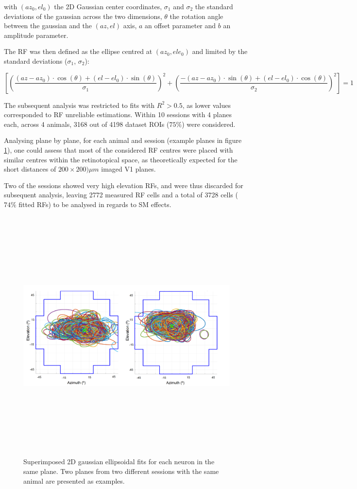 with $(az_0, el_0)$ the 2D Gaussian center coordinates, $\sigma_1$ and $\sigma_2$ the standard deviations of the gaussian across the two dimensions, $\theta$ the rotation angle between the gaussian and the $(az,el)$ axis, $a$ an offset parameter and $b$ an amplitude parameter.

The RF was then defined as the ellipse centred at $(az_0, ele_0)$ and limited by the standard deviations  ($\sigma_1$, $\sigma_2$):

\begin{equation}
\left[ \left( \dfrac{(az-az_0)\cdot \cos(\theta) + (el-el_0)\cdot \sin(\theta)}{\sigma_1}\right)^2 + \left(\dfrac{-(az-az_0)\cdot \sin(\theta) + (el-el_0)\cdot \cos(\theta)}{\sigma_2}\right)^2\right]=1
\end{equation}

The subsequent analysis was restricted to fits with $R^2>0.5$, as lower values corresponded to RF unreliable estimations. Within 10 sessions with 4 planes each, across 4 animals, 3168 out of 4198 dataset ROIs ($75\%$) were considered.

Analysing plane by plane, for each animal and session (example planes in figure \ref{ellipses}), one could assess that most of the considered RF centres were placed with similar centres within the retinotopical space, as theoretically expected for the short distances of $200 \times 200) \mu m$ imaged V1 planes. 

Two of the sessions showed very high elevation RFs, and were thus discarded for subsequent analysis, leaving 2772 measured RF cells and a total of 3728 cells ($74\%$ fitted RFs) to be analysed in regards to SM effects.

\begin{figure}[H] \centering \includegraphics[width=13cm,height=13cm,keepaspectratio]{Figures/7.Results/rf/ellipsesAnimal4pos2andpos5.png} 
\caption{Superimposed 2D gaussian ellipsoidal fits for each neuron in the same plane. Two planes from two different sessions with the same animal are presented as examples.}
\label{ellipses}
\end{figure}

